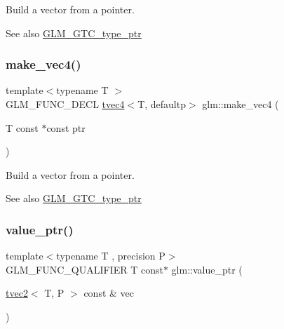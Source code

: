 Build a vector from a pointer. \begin{DoxySeeAlso}{See also}
\hyperlink{group__gtc__type__ptr}{G\+L\+M\+\_\+\+G\+T\+C\+\_\+type\+\_\+ptr} 
\end{DoxySeeAlso}
\mbox{\label{group__gtc__type__ptr_ga152345176b8951c15711f6ed4f6fc237}} 
\subsubsection{\texorpdfstring{make\+\_\+vec4()}{make\_vec4()}}
{\footnotesize\ttfamily template$<$typename T $>$ \\
G\+L\+M\+\_\+\+F\+U\+N\+C\+\_\+\+D\+E\+CL \hyperlink{structglm_1_1tvec4}{tvec4}$<$T, defaultp$>$ glm\+::make\+\_\+vec4 (\begin{DoxyParamCaption}\item[{T const $\ast$const}]{ptr }\end{DoxyParamCaption})}

Build a vector from a pointer. \begin{DoxySeeAlso}{See also}
\hyperlink{group__gtc__type__ptr}{G\+L\+M\+\_\+\+G\+T\+C\+\_\+type\+\_\+ptr} 
\end{DoxySeeAlso}
\mbox{\label{group__gtc__type__ptr_gafb01331238d8899dde700cb9b5dc6ef3}} 
\subsubsection{\texorpdfstring{value\+\_\+ptr()}{value\_ptr()}\hspace{0.1cm}{\footnotesize\ttfamily [1/27]}}
{\footnotesize\ttfamily template$<$typename T , precision P$>$ \\
G\+L\+M\+\_\+\+F\+U\+N\+C\+\_\+\+Q\+U\+A\+L\+I\+F\+I\+ER T const$\ast$ glm\+::value\+\_\+ptr (\begin{DoxyParamCaption}\item[{\hyperlink{structglm_1_1tvec2}{tvec2}$<$ T, P $>$ const \&}]{vec }\end{DoxyParamCaption})}

